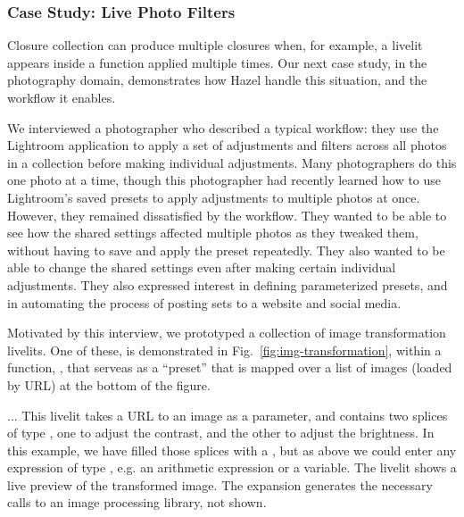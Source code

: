 \subsubsection{Case Study: Live Photo Filters}\label{sec:image-transformation}
Closure collection can produce multiple closures when, for example, 
a livelit appears inside a function applied multiple times. 
Our next case study, in the photography domain,
demonstrates how Hazel handle this situation, and 
the workflow it enables. 

We interviewed a photographer 
who described a typical workflow: 
they use the Lightroom application to 
apply a set of adjustments and filters 
across all photos in a collection before making 
individual adjustments. 
Many photographers do this one photo at a time,
though this photographer had recently learned how to
use Lightroom's saved presets to 
apply adjustments to multiple photos at once.
However, they remained dissatisfied by the workflow.
They wanted to be able to see how the shared settings affected 
multiple photos as they tweaked them, without having to 
save and apply the preset repeatedly.
They also wanted to be able to change the shared settings
even after making certain individual adjustments.
They also expressed interest in defining parameterized 
presets, and in automating the process of 
posting sets to a website and social media. 





Motivated by this interview, 
we prototyped a collection of image transformation livelits.
One of these,  is demonstrated in Fig.~\ref{fig:img-transformation},
within a function, , that serveas as a ``preset'' that is 
mapped over a list of images (loaded by URL) at the bottom of the figure. 

...
This livelit takes 
a URL to an image as a parameter, and contains two splices of type ,
one to adjust the contrast, and the other to adjust the brightness.
In this example, we have filled those splices with a , but 
as above we could enter any expression of type , e.g. 
an arithmetic expression or a variable. 
The livelit shows a live preview of the transformed image.
The expansion generates the necessary calls to an image processing library, 
not shown.

